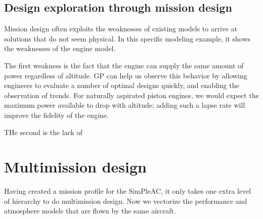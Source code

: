 \subsection{Design exploration through mission design}

Mission design often exploits the weaknesses of existing models to arrive at solutions
that do not seem physical. In this
specific modeling example, it shows the weaknesses of the engine model.


The first weakness is the fact that the engine can supply the same amount of power
regardless of altitude. \gls{GP} can help us observe this behavior by allowing engineers to
evaluate a number of optimal designs quickly, and enabling the observation of trends.
For naturally aspirated piston engines, we would expect the maximum power available to
drop with altitude; adding such a lapse rate will improve the fidelity of the engine.

THe second is the lack of

\section{Multimission design}

Having created a mission profile for the SimPleAC, it only takes one extra level of
hierarchy to do multimission design. Now we vectorize the performance
and atmosphere models that are flown by the same aircraft.


